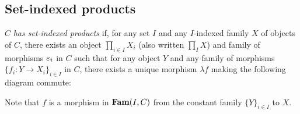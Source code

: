 \subsection{Set-indexed products}

$C$ \emph{has set-indexed products} if, for any set $I$ and any $I$-indexed family $X$ of objects of $C$,
there exists an object $\prod_{i \in I}X_i$ (also written $\prod_{I} X$) and family of morphisms $\varepsilon_i$ in
$C$ such that for any object $Y$ and any family of morphisms $\{f_i: Y \to X_i\}_{i \in I}$ in $C$, there
exists a unique morphism $\lambda f$ making the following diagram commute:

\begin{center}
\end{center}

Note that $f$ is a morphism in $\mathbf{Fam}(I,C)$ from the constant family $\{Y\}_{i \in I}$ to $X$.
